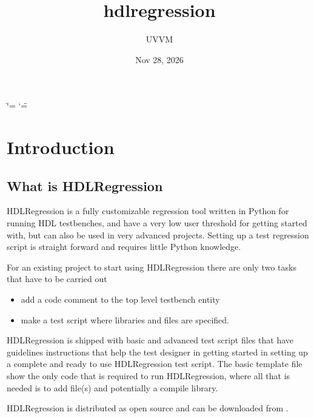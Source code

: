 \documentclass[letterpaper,10pt,english]{sphinxmanual}
\title{hdlregression}
\date{Nov 28, 2026}
\author{UVVM}
\begin{document}
\ifdefined\shorthandoff
  \ifnum\catcode`\=\string=\active\shorthandoff{=}\fi
  \ifnum\catcode`\"=\active{}\fi
\fi

\pagestyle{empty}
\sphinxmaketitle
\pagestyle{plain}
\sphinxtableofcontents
\pagestyle{normal}
\label{\detokenize{index::doc}}


\sphinxstepscope


\chapter{Introduction}
\label{\detokenize{intro:introduction}}\label{\detokenize{intro::doc}}

\section{What is HDLRegression}
\label{\detokenize{intro:what-is-hdlregression}}
\sphinxAtStartPar
HDLRegression is a fully customizable regression tool written in Python for running HDL testbenches, and have a
very low user threshold for getting started with, but can also be used in very advanced projects.
Setting up a test regression script is straight forward and requires little Python knowledge.

\sphinxAtStartPar
For an existing project to start using HDLRegression there are only two tasks that have to be carried out
\begin{itemize}
\item {} 
 \sphinxhyphen{} add a code comment to the top level testbench entity

\item {} 
 \sphinxhyphen{} make a test script where libraries and files are specified.

\end{itemize}

\sphinxAtStartPar
HDLRegression is shipped with basic and advanced test script {\hyperref[\detokenize{templates::doc}]{}} files that have guidelines instructions that help the
test designer in getting started in setting up a complete and ready to use HDLRegression test script.
The basic template file show the only code that is required to run HDLRegression, where all that is needed is to add file(s)
and potentially a compile library.

\sphinxAtStartPar
HDLRegression is distributed as open source and can be downloaded from .
\end{document}
